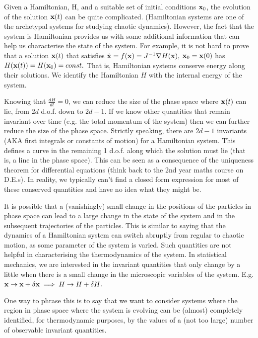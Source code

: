 Given a Hamiltonian, H, and a suitable set of initial conditions ${\bf x}_0$, the evolution of the solution ${\bf x}(t)$ can be quite complicated. (Hamiltonian systems are one of the archetypal systems for studying chaotic dynamics). However, the fact that the system is Hamiltonian provides us with some additional information that can help us characterise the state of the system. For example, it is not hard to prove that a solution ${\bf x}(t)$ that satisfies $\dot{\bf x} = f({\bf x}) = J^{-1}\nabla H({\bf x}),$ ${\bf x}_0 = {\bf x}(0)$ has $H({\bf x}(t)) = H({\bf x}_0)= const.$ That is, Hamiltonian systems conserve energy along their solutions. We identify the Hamiltonian $H$ with the internal energy of the system.

Knowing that $\frac{dH}{dt}=0$, we can reduce the size of the phase space where ${\bf x}(t)$ can lie, from $2d$ d.o.f. down to $2d-1$. If we know other quantities that remain invariant over time (e.g. the total momentum of the system) then we can further reduce the size of the phase space. Strictly speaking, there are $2d-1$ invariants (AKA first integrals or constants of motion) for a Hamiltonian system. This defines a curve in the remaining 1 d.o.f. along which the solution must lie (that is, a line in the phase space). This can be seen as a consequence of the uniqueness theorem for differential equations (think back to the 2nd year maths course on D.E.s). In reality, we typically can't find a closed form expression for most of these conserved quantities and have no idea what they might be.

It is possible that a (vanishingly) small change in the positions of the particles in phase space can lead to a large change in the state of the system and in the subsequent trajectories of the particles.
This is similar to saying that the dynamics of a Hamiltonian system can switch abruptly from regular to chaotic motion, as some parameter of the system is varied. 
Such quantities are not helpful in characterising the thermodynamics of the system.
In statistical mechanics, we are interested in the invariant quantities that only change by a little when there is a small change in the microscopic variables of the system. 
E.g. ${\bf x}\rightarrow {\bf x}+\delta {\bf x} \implies H\rightarrow H+\delta H$.

One way to phrase this is to say that we want to consider systems where the region in phase space where the system is evolving can be (almost) completely identified, for thermodynamic purposes, by the values of a (not too large) number of observable invariant quantities.

